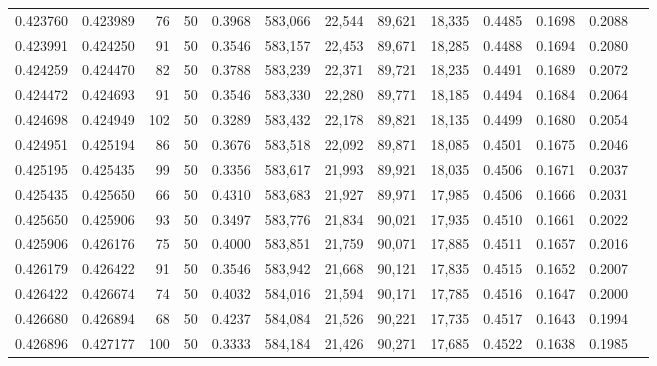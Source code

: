 \begin{tabular}{rrrrrrrrrrrrr}
0.423760 & 0.423989 &    76 &  50 &                                     0.3968 & 583,066 &  22,544 &  89,621 &  18,335 & 0.4485 & 0.1698 & 0.2088 \\
0.423991 & 0.424250 &    91 &  50 &                                     0.3546 & 583,157 &  22,453 &  89,671 &  18,285 & 0.4488 & 0.1694 & 0.2080 \\
0.424259 & 0.424470 &    82 &  50 &                                     0.3788 & 583,239 &  22,371 &  89,721 &  18,235 & 0.4491 & 0.1689 & 0.2072 \\
0.424472 & 0.424693 &    91 &  50 &                                     0.3546 & 583,330 &  22,280 &  89,771 &  18,185 & 0.4494 & 0.1684 & 0.2064 \\
0.424698 & 0.424949 &   102 &  50 &                                     0.3289 & 583,432 &  22,178 &  89,821 &  18,135 & 0.4499 & 0.1680 & 0.2054 \\
0.424951 & 0.425194 &    86 &  50 &                                     0.3676 & 583,518 &  22,092 &  89,871 &  18,085 & 0.4501 & 0.1675 & 0.2046 \\
0.425195 & 0.425435 &    99 &  50 &                                     0.3356 & 583,617 &  21,993 &  89,921 &  18,035 & 0.4506 & 0.1671 & 0.2037 \\
0.425435 & 0.425650 &    66 &  50 &                                     0.4310 & 583,683 &  21,927 &  89,971 &  17,985 & 0.4506 & 0.1666 & 0.2031 \\
0.425650 & 0.425906 &    93 &  50 &                                     0.3497 & 583,776 &  21,834 &  90,021 &  17,935 & 0.4510 & 0.1661 & 0.2022 \\
0.425906 & 0.426176 &    75 &  50 &                                     0.4000 & 583,851 &  21,759 &  90,071 &  17,885 & 0.4511 & 0.1657 & 0.2016 \\
0.426179 & 0.426422 &    91 &  50 &                                     0.3546 & 583,942 &  21,668 &  90,121 &  17,835 & 0.4515 & 0.1652 & 0.2007 \\
0.426422 & 0.426674 &    74 &  50 &                                     0.4032 & 584,016 &  21,594 &  90,171 &  17,785 & 0.4516 & 0.1647 & 0.2000 \\
0.426680 & 0.426894 &    68 &  50 &                                     0.4237 & 584,084 &  21,526 &  90,221 &  17,735 & 0.4517 & 0.1643 & 0.1994 \\
0.426896 & 0.427177 &   100 &  50 &                                     0.3333 & 584,184 &  21,426 &  90,271 &  17,685 & 0.4522 & 0.1638 & 0.1985 \\

\end{tabular}
